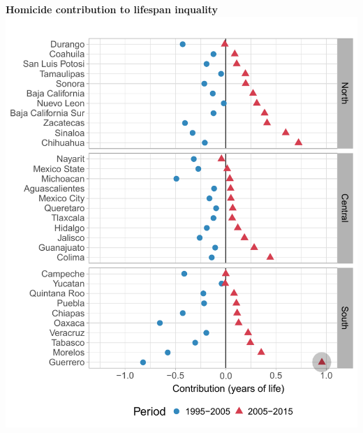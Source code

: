 \documentclass[xcolor={dvipsnames}]{beamer}
\begin{document}
\begin{frame}
	\begin{center}
		\Large{\textbf{Homicide contribution to lifespan inquality}}
		\includegraphics[scale=.47]{Figures/Figure_43}
	\end{center}

\end{frame}
\end{document}
